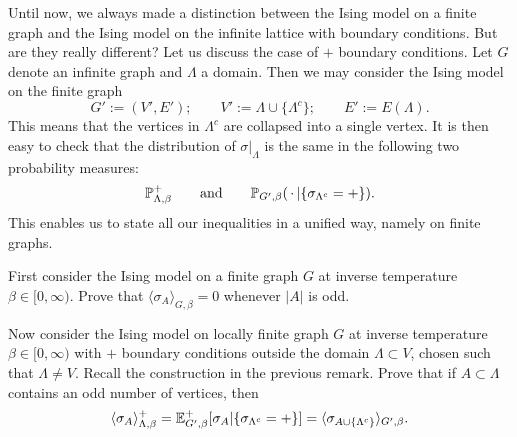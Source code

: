 \begin{remark}
    \label{remark:infinite_graphs_as_finite_graphs}
    Until now, we always made a distinction between the Ising model on a finite graph
    and the Ising model on the infinite lattice with boundary conditions.
    But are they really different?
    Let us discuss the case of $+$ boundary conditions.
    Let $G$ denote an infinite graph and $\Lambda$ a domain.
    Then we may consider the Ising model on the finite graph
    \[
        G':=(V',E');
        \qquad
        V':=\Lambda\cup \{\Lambda^c\};
        \qquad
        E':=E(\Lambda).
    \]
    This means that the vertices in $\Lambda^c$ are collapsed
    into a single vertex.
    It is then easy to check that
    the distribution of $\sigma|_{\Lambda}$ is the same in the following two probability measures:
    \[
        \P^+_{\Lambda,\beta}
        \qquad
        \text{and}
        \qquad
        \P_{G',\beta}(\blank|\{\sigma_{\Lambda^c}=+\}).
    \]
    This enables us to state all our inequalities in a unified way,
    namely on finite graphs.
\end{remark}

\begin{exercise}
    \label{exercise:infinite_graphs_as_finite_graphs}
    First consider the Ising model on a finite graph $G$ at inverse temperature
    $\beta\in[0,\infty)$.
    Prove that $\langle\sigma_A\rangle_{G,\beta}=0$
    whenever $|A|$ is odd.

    Now consider the Ising model on locally finite graph $G$ at inverse temperature
    $\beta\in[0,\infty)$ with $+$ boundary conditions outside the domain
    $\Lambda\subset V$, chosen such that $\Lambda\neq V$.
    Recall the construction in the previous remark.
    Prove that if $A\subset\Lambda$ contains an odd number of vertices,
    then
    \[
        \langle\sigma_A\rangle_{\Lambda,\beta}^+
        =
        \mathbb E_{G',\beta}^+[\sigma_A|\{\sigma_{\Lambda^c}=+\}]
        =
        \langle\sigma_{A\cup\{\Lambda^c\}}\rangle_{G',\beta}.
    \]
\end{exercise}
